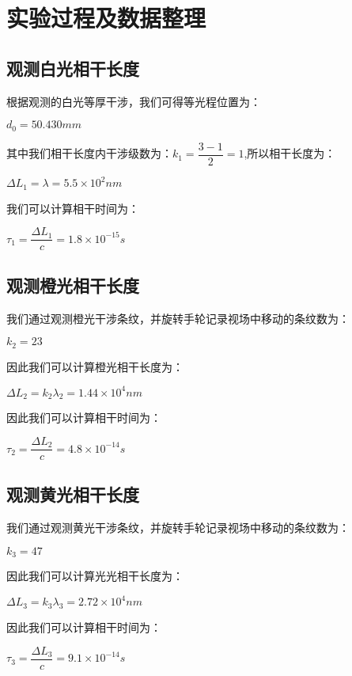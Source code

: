 \documentclass[UTF8]{ctexart}
\begin{document}
	\section{实验过程及数据整理}
	\subsection{观测白光相干长度}
	根据观测的白光等厚干涉，我们可得等光程位置为：
	\begin{center}
		$d_{0}=50.430mm$
	\end{center}
\par 其中我们相干长度内干涉级数为：$k_{1}=\dfrac{3-1}{2}=1$,所以相干长度为：
\begin{center}
	$\Delta L_{1}=\lambda=5.5\times10^{2}nm$
\end{center}
\par 我们可以计算相干时间为：
\begin{center}
	$\tau_{1}=\dfrac{\Delta L_{1}}{c}=1.8\times10^{-15}s$
\end{center}
\subsection{观测橙光相干长度}
我们通过观测橙光干涉条纹，并旋转手轮记录视场中移动的条纹数为：
\begin{center}
	$k_{2}=23$
\end{center}
\par 因此我们可以计算橙光相干长度为：
\begin{center}
	$\Delta L_{2}=k_{2}\lambda_{2}=1.44\times10^{4}nm$
\end{center}
\par 因此我们可以计算相干时间为：
\begin{center}
	$\tau_{2}=\dfrac{\Delta L_{2}}{c}=4.8\times10^{-14}s$
\end{center}
\subsection{观测黄光相干长度}
我们通过观测黄光干涉条纹，并旋转手轮记录视场中移动的条纹数为：
\begin{center}
	$k_{3}=47$
\end{center}
\par 因此我们可以计算光光相干长度为：
\begin{center}
	$\Delta L_{3}=k_{3}\lambda_{3}=2.72\times10^{4}nm$
\end{center}
\par 因此我们可以计算相干时间为：
\begin{center}
	$\tau_{3}=\dfrac{\Delta L_{3}}{c}=9.1\times10^{-14}s$
\end{center}
\end{document}

